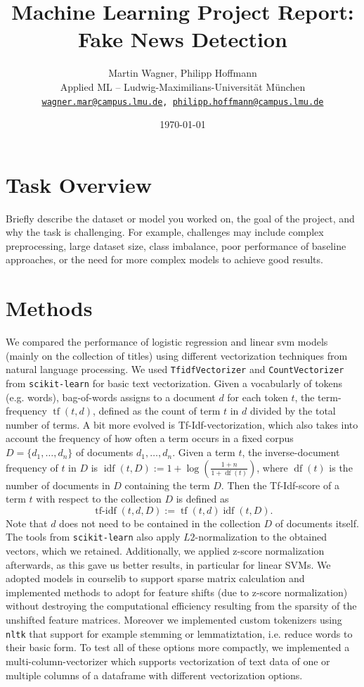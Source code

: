 \documentclass[10pt]{article}
\title{\textbf{Machine Learning Project Report: Fake News Detection}}
\author{Martin Wagner, Philipp Hoffmann \\
	Applied ML – Ludwig-Maximilians-Universität München \\
	\texttt{\href{mailto:wagner.mar@campus.lmu.de}{wagner.mar@campus.lmu.de},
	\href{mailto:philipp.hoffmann@campus.lmu.de}{philipp.hoffmann@campus.lmu.de}}}
\date{\today}
\begin{document}
	
	\maketitle
	
	\section{Task Overview}
	Briefly describe the dataset or model you worked on, the goal of the project, and why the task is challenging. For example, challenges may include complex preprocessing, large dataset size, class imbalance, poor performance of baseline approaches, or the need for more complex models to achieve good results.
	
	\blindtext
	
	\section{Methods}
	We compared the performance of logistic regression and linear svm models (mainly on the collection of titles) using different vectorization techniques from natural language processing. 
	We used \texttt{TfidfVectorizer} and \texttt{CountVectorizer} from \texttt{scikit-learn} for basic text vectorization. Given a vocabularly of tokens (e.g. words), bag-of-words assigns to a document $d$ for each token $t$, the term-frequency $\operatorname{tf}(t,d)$, defined as the count of term $t$ in $d$ divided by the total number of terms. A bit more evolved is Tf-Idf-vectorization, which also takes into account the frequency of how often a term occurs in a fixed corpus $D=\{d_1, \dots, d_n\}$ of documents $d_1, \dots, d_n$. Given a term $t$, the inverse-document frequency of $t$ in $D$ is $\operatorname{idf}(t,D):=1+\log\left(\frac{1+n}{1+\operatorname{df}(t)}\right)$, where $\operatorname{df}(t)$ is the number of documents in $D$ containing the term $D$. Then the Tf-Idf-score of a term $t$ with respect to the collection $D$ is defined as \[\operatorname{tf-idf}(t,d,D):=\operatorname{tf}(t,d)\operatorname{idf}(t,D).\]
	Note that $d$ does not need to be contained in the collection $D$ of documents itself. The tools from \texttt{scikit-learn} also apply $L2$-normalization to the obtained vectors, which we retained. Additionally, we applied z-score normalization afterwards, as this gave us better results, in particular for linear SVMs. 
	We adopted models in courselib to support sparse matrix calculation and implemented methods to adopt for feature shifts (due to z-score normalization) without destroying the computational efficiency resulting from the sparsity of the unshifted feature matrices. Moreover we implemented custom tokenizers using \texttt{nltk} 
	that support for example stemming or lemmatiztation, i.e. reduce words to their basic form. To test all of these options more compactly, we implemented a multi-column-vectorizer which supports vectorization of text data of one or multiple columns of a dataframe with different vectorization options.
	
\end{document}
